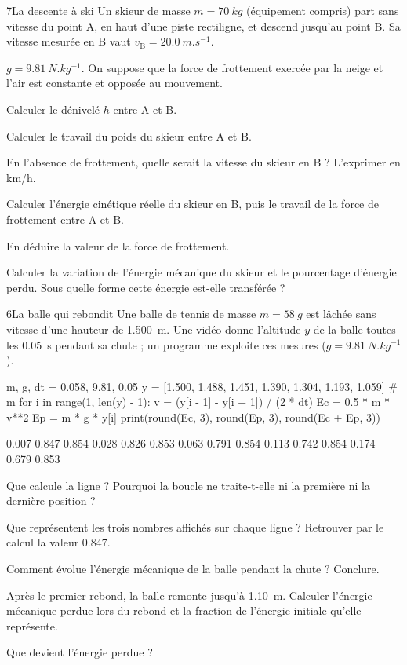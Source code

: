 \begin{exoBac}{7}{La descente à ski}
Un skieur de masse $m=\qty{70}{kg}$ (équipement compris) part sans vitesse du point A, en haut d'une piste rectiligne, et descend
jusqu'au point B. Sa vitesse mesurée en B vaut $v_\mathrm{B}=\qty{20,0}{m.s^{-1}}$.
\begin{donnees}
$g=\qty{9,81}{N.kg^{-1}}$. On suppose que la force de frottement exercée par la neige et l'air est constante et opposée au mouvement.
\end{donnees}
\begin{questions}
\item Calculer le dénivelé $h$ entre A et B.
\item Calculer le travail du poids du skieur entre A et B.
\item En l'absence de frottement, quelle serait la vitesse du skieur en B ? L'exprimer en \unit{km/h}.
\item Calculer l'énergie cinétique réelle du skieur en B, puis le travail de la force de frottement entre A et B.
\item En déduire la valeur de la force de frottement.
\item Calculer la variation de l'énergie mécanique du skieur et le pourcentage d'énergie perdu. Sous quelle forme cette
énergie est-elle transférée ?
\end{questions}
\end{exoBac}

\begin{exoBac}{6}{La balle qui rebondit}
Une balle de tennis de masse $m=\qty{58}{g}$ est lâchée sans vitesse d'une hauteur de \qty{1,500}{m}. Une vidéo donne l'altitude $y$ de la
balle toutes les \qty{0,05}{s} pendant sa chute ; un programme exploite ces mesures ($g=\qty{9,81}{N.kg^{-1}}$).
\begin{python}
m, g, dt = 0.058, 9.81, 0.05
y = [1.500, 1.488, 1.451, 1.390, 1.304, 1.193, 1.059]     # m
for i in range(1, len(y) - 1):
    v = (y[i - 1] - y[i + 1]) / (2 * dt)
    Ec = 0.5 * m * v**2
    Ep = m * g * y[i]
    print(round(Ec, 3), round(Ep, 3), round(Ec + Ep, 3))
\end{python}
\begin{console}
0.007 0.847 0.854
0.028 0.826 0.853
0.063 0.791 0.854
0.113 0.742 0.854
0.174 0.679 0.853
\end{console}
\begin{questions}
\item {}Que calcule la ligne  ? Pourquoi la boucle ne traite-t-elle ni la première ni la dernière position ?
\item Que représentent les trois nombres affichés sur chaque ligne ? Retrouver par le calcul la valeur 0.847.
\item Comment évolue l'énergie mécanique de la balle pendant la chute ? Conclure.
\item Après le premier rebond, la balle remonte jusqu'à \qty{1,10}{m}. Calculer l'énergie mécanique perdue lors du rebond et la
fraction de l'énergie initiale qu'elle représente.
\item Que devient l'énergie perdue ?
\end{questions}
\end{exoBac}
